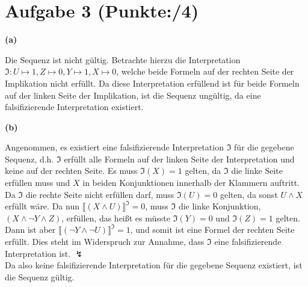 \documentclass[11pt, a4paper]{article}
\newcommand{\pp}{4}
\begin{document}
\section*{Aufgabe 3 (Punkte:\qquad/\pp)}
\textbf{(a)}
\begin{adjustwidth}{20pt}{20pt}
Die Sequenz ist nicht gültig. Betrachte hierzu die Interpretation $\mathfrak{I}:U \mapsto 1,Z \mapsto 0, Y \mapsto 1, X \mapsto 0$, welche beide Formeln auf der rechten Seite
der Implikation nicht erfüllt. Da diese Interpretation erfüllend ist für beide Formeln auf der linken Seite der Implikation, ist die Sequenz ungültig, da eine falsifizierende Interpretation
existiert.
\end{adjustwidth}
\textbf{(b)}
\begin{adjustwidth}{20pt}{20pt}
Angenommen, es existiert eine falsifizierende Interpretation $\mathfrak{I}$ für die gegebene Sequenz, d.h. $\mathfrak{I}$ erfüllt alle Formeln auf der linken Seite der Interpretation
und keine auf der rechten Seite. Es muss $\mathfrak{I}(X)=1$ gelten, da $\mathfrak{I}$ die linke Seite erfüllen muss und $X$ in beiden Konjunktionen innerhalb der Klammern auftritt.
Da $\mathfrak{I}$ die rechte Seite nicht erfüllen darf, muss $\mathfrak{I}(U)=0$ gelten, da sonst $U \wedge X$ erfüllt wäre. Da nun $\llbracket (X \wedge U)\rrbracket^\mathfrak{I}=0$,
muss $\mathfrak{I}$ die linke Konjunktion, $(X \wedge \neg Y \wedge Z)$, erfüllen, das heißt es müsste $\mathfrak{I}(Y)=0$ und $\mathfrak{I}(Z)=1$ gelten. Dann ist aber
$\llbracket (\neg Y \wedge \neg U)\rrbracket^\mathfrak{I}=1$, und somit ist eine Formel der rechten Seite erfüllt. Dies steht im Widerspruch zur Annahme, dass $\mathfrak{I}$ eine
falsifizierende Interpretation ist. $\lightning$\\
Da also keine falsifizierende Interpretation für die gegebene Sequenz existiert, ist die Sequenz gültig.
\end{adjustwidth}
\end{document}
